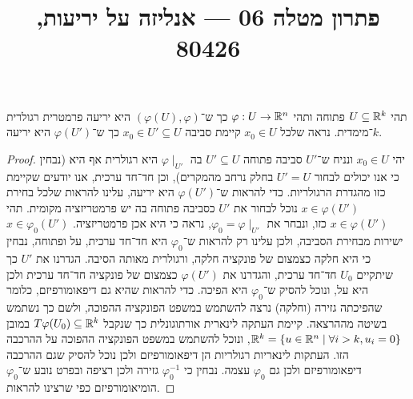 
\title{פתרון מטלה 06 --- אנליזה על יריעות, 80426}

\DeclareMathOperator{\vol}{vol}


\maketitle
\maketitleprint[blue]

\question{}
תהי $U \subseteq \mathbb{R}^k$ פתוחה ותהי $\varphi : U \to \mathbb{R}^n$ כך ש־$(\varphi(U), \varphi)$ היא יריעה פרמטרית רגולרית $k$־מימדית.
נראה שלכל $x_0 \in U$ קיימת סביבה $x_0 \in U' \subseteq U$ כך ש־$\varphi(U')$ היא יריעה.
\begin{proof}
	יהי $x_0 \in U$ ונניח ש־$U'$ סביבה פתוחה $U' \subseteq U$ בה $\varphi \mid_{U'}$ היא רגולרית אף היא (נבחין כי אנו יכולים לבחור $U' = U$ בחלק נרחב מהמקרים), וכן חד־חד ערכית, אנו יודעים שקיימת כזו מהגדרת הרגולריות.
	כדי להראות ש־$\varphi(U')$ היא יריעה, עלינו להראות שלכל בחירת $x \in \varphi(U')$ נוכל לבחור את $U'$ כסביבה פתוחה בה יש פרמטריזציה מקומית.
	תהי $x \in \varphi(U')$ כזו, ונבחר את $\varphi_0 = \varphi \mid_{U'}$, נראה כי היא אכן פרמטריזציה.
	$x \in \varphi_0(U')$ ישירות מבחירת הסביבה, ולכן עלינו רק להראות ש־$\varphi_0$ היא חד־חד ערכית, על ופתוחה, נבחין כי היא חלקה כצמצום של פונקציה חלקה, ורגולרית מאותה הסיבה.
	הגדרנו את $U'$ כך שיתקיים $U_0$ חד־חד ערכית, והגדרנו את $\varphi(U')$ כצמצום של פונקציה חד־חד ערכית ולכן היא על, ונוכל להסיק ש־$\varphi_0$ היא הפיכה.
	כדי להראות שהיא גם דיפאומורפיזם, כלומר שהפיכתה גזירה (וחלקה) נרצה להשתמש במשפט הפונקציה ההפוכה, ולשם כך נשתמש בשיטה מההרצאה.
	קיימת העתקה לינארית אורתוגונלית כך שנקבל $T \varphi(U_0) \subseteq \mathbb{R}^k$ במובן $\mathbb{R}^k = \{ u \in \mathbb{R}^n \mid \forall i > k, u_i = 0 \}$, ונוכל להשתמש במשפט הפונקציה ההפוכה על ההרכבה הזו.
	העתקות לינאריות רגולריות הן דיפאומורפיזם ולכן נוכל להסיק שגם ההרכבה דיפאומורפיזם ולכן גם $\varphi_0$ עצמה.
	נבחין כי $\varphi_0^{-1}$ גזירה ולכן רציפה ובפרט נובע ש־$\varphi_0$ הומיאומורפיזם כפי שרצינו להראות.
\end{proof}

